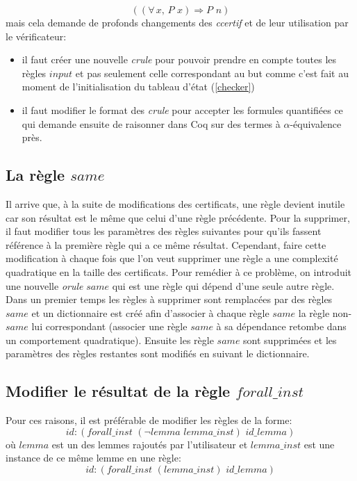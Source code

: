 \documentclass[11pt]{article}
\begin{document}
\[   ((\forall \, x, \, P\,\, x) \Rightarrow P \,\, n) \]
mais cela demande de profonds changements des \textit{ccertif} et de leur utilisation par le vérificateur: 
\begin{itemize}

\item il faut créer une nouvelle \textit{crule} pour pouvoir prendre en compte toutes les règles $input$ et pas seulement celle correspondant au but comme c'est fait au moment de l'initialisation du tableau d'état (\ref{checker})
\item il faut modifier le format des \textit{crule} pour accepter les formules quantifiées ce qui demande ensuite de raisonner dans Coq sur des termes à $\alpha$-équivalence près.
\end{itemize}

\subsection{La règle $same$}

Il arrive que, à la suite de modifications des certificats, une règle devient inutile car son résultat est le même que celui d'une règle précédente. Pour la supprimer, il faut modifier tous les paramètres des règles suivantes pour qu'ils fassent référence à la première règle qui a ce même résultat. Cependant, faire cette modification à chaque fois que l'on veut supprimer une règle a une complexité quadratique en la taille des certificats. Pour remédier à ce problème, on introduit une nouvelle \textit{orule} $same$ qui est une règle qui dépend d'une seule autre règle. Dans un premier temps les règles à supprimer sont remplacées par des règles $same$ et un dictionnaire est créé afin d'associer à chaque règle $same$ la règle non-$same$ lui correspondant (associer une règle $same$ à sa dépendance retombe dans un comportement quadratique). Ensuite les règle $same$ sont supprimées et les paramètres des règles restantes sont modifiés en suivant le dictionnaire.

\subsection{Modifier le résultat de la règle $forall\_inst$} \label{processing_forallinst}

Pour ces raisons, il est préférable de modifier les règles de la forme:
\[id:(forall\_inst \,\,(\neg lemma \,\, lemma\_inst) \,\,id\_lemma)\]
où $lemma$ est un des lemmes rajoutés par l'utilisateur et $lemma\_inst$ est une instance de ce même lemme en une règle:
\[id:(forall\_inst \,\,(lemma\_inst) \,\, id\_lemma)\]
\end{document}
